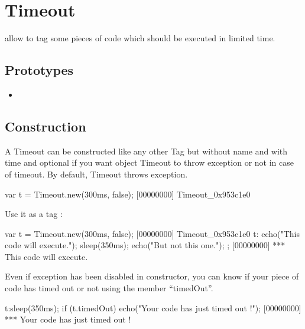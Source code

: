 \section{Timeout}

 allow to tag some pieces of code which should be executed in limited time.

\subsection{Prototypes}
\begin{itemize}
\item {}
\end{itemize}

\subsection{Construction}
A Timeout can be constructed like any other Tag but without name and
with time and optional if you want object Timeout to throw exception
or not in case of timeout. By default, Timeout throws exception.

\begin{urbiscript}
var t = Timeout.new(300ms, false);
[00000000] Timeout_0x953c1e0
\end{urbiscript}

Use it as a tag :

\begin{urbiscript}
var t = Timeout.new(300ms, false);
[00000000] Timeout_0x953c1e0
t:{
  echo("This code will execute.");
  sleep(350ms);
  echo("But not this one.");
};
[00000000] *** This code will execute.
\end{urbiscript}

Even if exception has been disabled in constructor, you can know if your piece of code has timed out or not using the member ``timedOut''.

\begin{urbiscript}
t:sleep(350ms);
if (t.timedOut)
  echo("Your code has just timed out !");
[00000000] *** Your code has just timed out !
\end{urbiscript}

